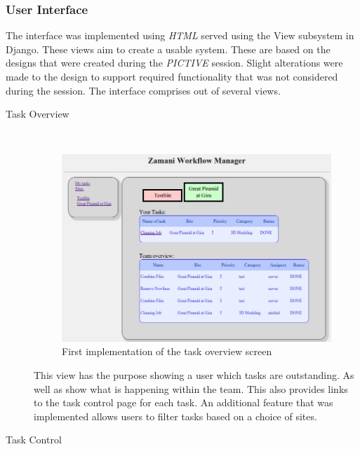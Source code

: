 \documentclass[12pt,a4paper]{report}
\begin{document}
\subsubsection{User Interface}
The interface was implemented using \emph{HTML} served using the View subsystem in Django.
These views aim to create a usable system. These are based on the designs that were created
during the \emph{PICTIVE} session. Slight alterations were made to the design to support required
functionality that was not considered during the session. The interface comprises out of several
views.
\begin{description}
\item[Task Overview] \hfill \\
    \begin{figure}[!h]
        \begin{center}
            \includegraphics[scale=0.4]{figures/task_overview_impl2.png}
        \end{center}
        \caption{First implementation of the task overview screen}
        \label{task_overview_impl2}
    \end{figure}
    This view has the purpose showing a user which tasks are outstanding. As well as show what is
    happening within the team. This also provides links to the task control page for each task.
    An additional feature that was implemented allows users to filter tasks based on a choice
    of sites.
\item[Task Control] \hfill \\
    \begin{figure}[!h]
        \begin{center}

\end{center}
\end{figure}
\end{description}
\end{document}
